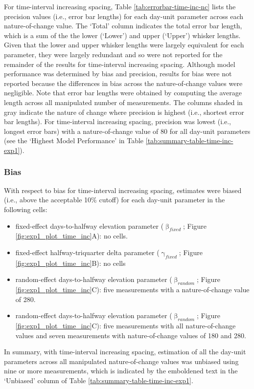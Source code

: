 \documentclass[
12pt, %
twoside,
english]{guelphthesis}
\begin{document}
For time-interval increasing spacing, Table \ref{tab:errorbar-time-inc-nc} lists the precision values (i.e., error bar lengths) for each day-unit parameter across each nature-of-change value. The `Total' column indicates the total error bar length, which is a sum of the the lower (`Lower') and upper (`Upper') whisker lengths. Given that the lower and upper whisker lengths were largely equivalent for each parameter, they were largely redundant and so were not reported for the remainder of the results for time-interval increasing spacing. Although model performance was determined by bias and precision, results for bias were not reported because the differences in bias across the nature-of-change values were negligible. Note that error bar lengths were obtained by computing the average length across all manipulated number of measurements. The columns shaded in gray indicate the nature of change where precision is highest (i.e., shortest error bar lengths). For time-interval increasing spacing, precision was lowest (i.e., longest error bars) with a nature-of-change value of 80 for all day-unit parameters (see the `Highest Model Performance' in Table \ref{tab:summary-table-time-inc-exp1}).

\hypertarget{bias-time-inc-exp1}{%
\subsubsection{Bias}\label{bias-time-inc-exp1}}

With respect to bias for time-interval increasing spacing, estimates were biased (i.e., above the acceptable 10\% cutoff) for each day-unit parameter in the following cells:
\begin{itemize}
\tightlist
\item
  fixed-effect days-to-halfway elevation parameter (\(\upbeta_{fixed}\); Figure \ref{fig:exp1_plot_time_inc}A): no cells.
\item
  fixed-effect halfway-triquarter delta parameter (\(\upgamma_{fixed}\); Figure \ref{fig:exp1_plot_time_inc}B): no cells
\item
  random-effect days-to-halfway elevation parameter (\(\upbeta_{random}\); Figure \ref{fig:exp1_plot_time_inc}C): five measurements with a nature-of-change value of 280.
\item
  random-effect days-to-halfway elevation parameter (\(\upbeta_{random}\); Figure \ref{fig:exp1_plot_time_inc}C): five measurements with all nature-of-change values and seven measurements with nature-of-change values of 180 and 280.
\end{itemize}
In summary, with time-interval increasing spacing, estimation of all the day-unit parameters across all manipulated nature-of-change values was unbiased using nine or more measurements, which is indicated by the emboldened text in the `Unbiased' column of Table \ref{tab:summary-table-time-inc-exp1}.
\end{document}
